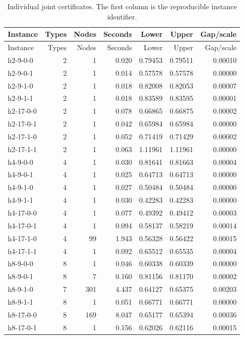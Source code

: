 \begin{longtable}{lrrrrrr}
\caption{Individual joint certificates. The first column is the reproducible instance identifier.}\label{tab:r46-all}\\
\toprule Instance & Types & Nodes & Seconds & Lower & Upper & Gap/scale \\\midrule\endfirsthead
\toprule Instance & Types & Nodes & Seconds & Lower & Upper & Gap/scale \\\midrule\endhead
h2-9-0-0 & 2 & 1 & 0.020 & 0.79453 & 0.79511 & 0.00010 \\
h2-9-0-1 & 2 & 1 & 0.014 & 0.57578 & 0.57578 & 0.00000 \\
h2-9-1-0 & 2 & 1 & 0.018 & 0.82008 & 0.82053 & 0.00007 \\
h2-9-1-1 & 2 & 1 & 0.018 & 0.83589 & 0.83595 & 0.00001 \\
h2-17-0-0 & 2 & 1 & 0.078 & 0.66865 & 0.66875 & 0.00002 \\
h2-17-0-1 & 2 & 1 & 0.042 & 0.65984 & 0.65984 & 0.00000 \\
h2-17-1-0 & 2 & 1 & 0.052 & 0.71419 & 0.71429 & 0.00002 \\
h2-17-1-1 & 2 & 1 & 0.063 & 1.11961 & 1.11961 & 0.00000 \\
h4-9-0-0 & 4 & 1 & 0.030 & 0.81641 & 0.81663 & 0.00004 \\
h4-9-0-1 & 4 & 1 & 0.025 & 0.64713 & 0.64713 & 0.00000 \\
h4-9-1-0 & 4 & 1 & 0.027 & 0.50484 & 0.50484 & 0.00000 \\
h4-9-1-1 & 4 & 1 & 0.030 & 0.42283 & 0.42283 & 0.00000 \\
h4-17-0-0 & 4 & 1 & 0.077 & 0.49392 & 0.49412 & 0.00003 \\
h4-17-0-1 & 4 & 1 & 0.094 & 0.58137 & 0.58219 & 0.00014 \\
h4-17-1-0 & 4 & 99 & 1.943 & 0.56328 & 0.56422 & 0.00015 \\
h4-17-1-1 & 4 & 1 & 0.092 & 0.65512 & 0.65535 & 0.00004 \\
h8-9-0-0 & 8 & 1 & 0.046 & 0.60338 & 0.60339 & 0.00000 \\
h8-9-0-1 & 8 & 7 & 0.160 & 0.81156 & 0.81170 & 0.00002 \\
h8-9-1-0 & 7 & 301 & 4.437 & 0.64127 & 0.65375 & 0.00203 \\
h8-9-1-1 & 8 & 1 & 0.051 & 0.66771 & 0.66771 & 0.00000 \\
h8-17-0-0 & 8 & 169 & 8.047 & 0.65177 & 0.65394 & 0.00036 \\
h8-17-0-1 & 8 & 1 & 0.156 & 0.62026 & 0.62116 & 0.00015 \\

\end{longtable}
